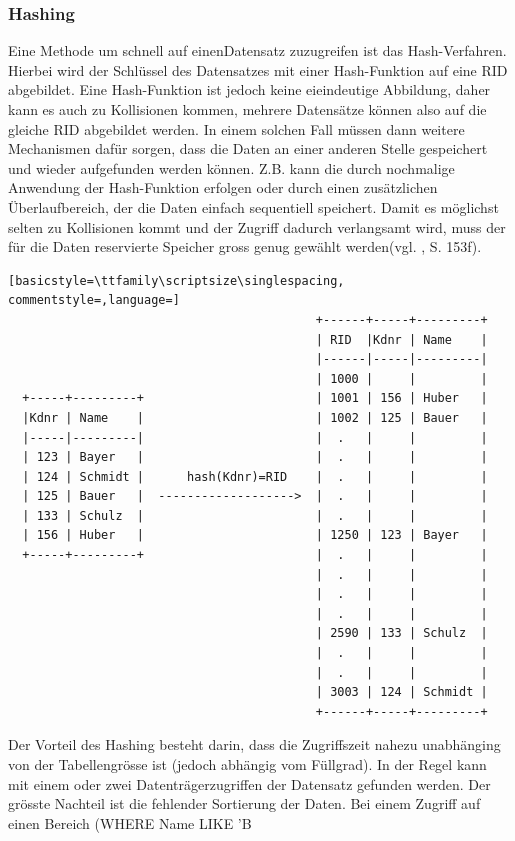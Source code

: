 \subsubsection{Hashing}
Eine Methode um schnell auf einenDatensatz zuzugreifen ist das Hash-Verfahren. Hierbei wird der Schlüssel des Datensatzes mit einer Hash-Funktion auf eine RID abgebildet. Eine Hash-Funktion ist jedoch keine eieindeutige Abbildung, daher kann es auch zu Kollisionen kommen, mehrere Datensätze können also auf die gleiche RID abgebildet werden. In einem solchen Fall müssen dann weitere Mechanismen dafür sorgen, dass die Daten an einer anderen Stelle gespeichert und wieder aufgefunden werden können. Z.B. kann die durch nochmalige Anwendung der Hash-Funktion erfolgen oder durch einen zusätzlichen Überlaufbereich, der die Daten einfach sequentiell speichert. Damit es möglichst selten zu Kollisionen kommt und der Zugriff dadurch verlangsamt wird, muss der für die Daten reservierte Speicher gross genug gewählt werden(vgl. \cite{Sauer1998}, S. 153f).
\begin{lstlisting}[basicstyle=\ttfamily\scriptsize\singlespacing, commentstyle=,language=]
                                           +------+-----+---------+
                                           | RID  |Kdnr | Name    |
                                           |------|-----|---------|
                                           | 1000 |     |         |
  +-----+---------+                        | 1001 | 156 | Huber   |
  |Kdnr | Name    |                        | 1002 | 125 | Bauer   |
  |-----|---------|                        |  .   |     |         |
  | 123 | Bayer   |                        |  .   |     |         |
  | 124 | Schmidt |      hash(Kdnr)=RID    |  .   |     |         |
  | 125 | Bauer   |  ------------------->  |  .   |     |         |
  | 133 | Schulz  |                        |  .   |     |         |
  | 156 | Huber   |                        | 1250 | 123 | Bayer   |
  +-----+---------+                        |  .   |     |         |
                                           |  .   |     |         |
                                           |  .   |     |         |
                                           |  .   |     |         |
                                           | 2590 | 133 | Schulz  |
                                           |  .   |     |         |
                                           |  .   |     |         |
                                           | 3003 | 124 | Schmidt |
                                           +------+-----+---------+
\end{lstlisting}
Der Vorteil des Hashing besteht darin, dass die Zugriffszeit nahezu unabhänging von der Tabellengrösse ist (jedoch abhängig vom Füllgrad). In der Regel kann mit einem oder zwei Datenträgerzugriffen der Datensatz gefunden werden.
Der grösste Nachteil ist die fehlender Sortierung der Daten. Bei einem Zugriff auf einen Bereich (WHERE Name LIKE 'B%

